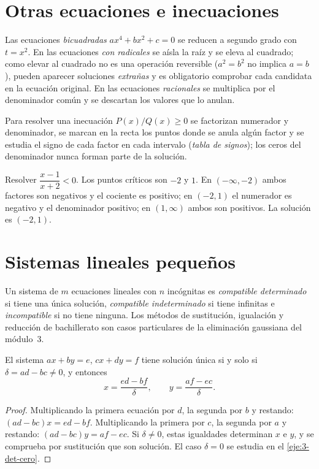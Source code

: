 \section{Otras ecuaciones e inecuaciones}

Las ecuaciones \emph{bicuadradas} $ax^4+bx^2+c=0$ se reducen a segundo grado con $t=x^2$. En las ecuaciones \emph{con radicales} se aísla la raíz y se eleva al cuadrado; como elevar al cuadrado no es una operación reversible ($a^2=b^2$ no implica $a=b$), pueden aparecer soluciones \emph{extrañas} y es obligatorio comprobar cada candidata en la ecuación original. En las ecuaciones \emph{racionales} se multiplica por el denominador común y se descartan los valores que lo anulan.

Para resolver una inecuación $P(x)/Q(x)\ge0$ se factorizan numerador y denominador, se marcan en la recta los puntos donde se anula algún factor y se estudia el signo de cada factor en cada intervalo (\emph{tabla de signos}); los ceros del denominador nunca forman parte de la solución.

\begin{ejemplo}\label{ej:tabla-signos}
Resolver $\dfrac{x-1}{x+2}<0$. Los puntos críticos son $-2$ y $1$. En $(-\infty,-2)$ ambos factores son negativos y el cociente es positivo; en $(-2,1)$ el numerador es negativo y el denominador positivo; en $(1,\infty)$ ambos son positivos. La solución es $(-2,1)$.
\end{ejemplo}

\section{Sistemas lineales pequeños}

Un sistema de $m$ ecuaciones lineales con $n$ incógnitas es \emph{compatible determinado} si tiene una única solución, \emph{compatible indeterminado} si tiene infinitas e \emph{incompatible} si no tiene ninguna. Los métodos de sustitución, igualación y reducción de bachillerato son casos particulares de la eliminación gaussiana del módulo~3.

\begin{teorema}\label{teo:cramer}
El sistema $ax+by=e$, $cx+dy=f$ tiene solución única si y solo si $\delta=ad-bc\neq0$, y entonces
\[
x=\frac{ed-bf}{\delta},\qquad y=\frac{af-ec}{\delta}.
\]
\end{teorema}

\begin{proof}
Multiplicando la primera ecuación por $d$, la segunda por $b$ y restando: $(ad-bc)x=ed-bf$. Multiplicando la primera por $c$, la segunda por $a$ y restando: $(ad-bc)y=af-ec$. Si $\delta\neq0$, estas igualdades determinan $x$ e $y$, y se comprueba por sustitución que son solución. El caso $\delta=0$ se estudia en el \cref{eje:3-det-cero}.
\end{proof}

